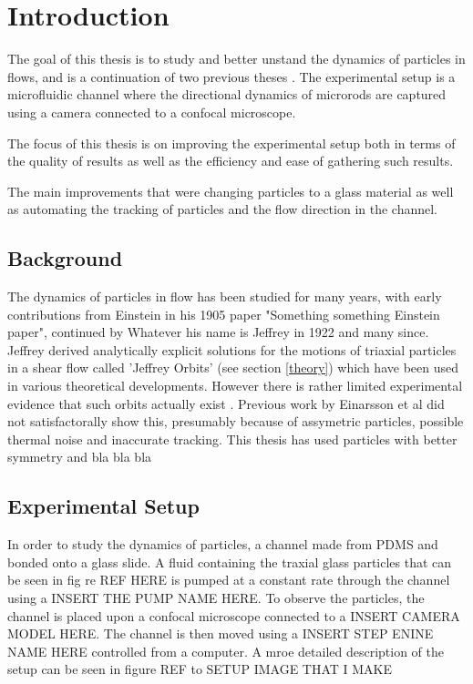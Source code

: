 \documentclass[]{report}
\title{}
\author{}
\begin{document}
\maketitle

\begin{abstract}

\end{abstract}

\chapter{Introduction}
The goal of this thesis is to study and better unstand the dynamics of particles in flows, and is a continuation of two previous theses \cite{AntonExjobb}\cite{JonasExjobb}. The experimental setup is a microfluidic channel where the directional dynamics of microrods are captured using a camera connected to a confocal microscope. 

The focus of this thesis is on improving the experimental setup both in terms of the quality of results as well as the efficiency and ease of gathering such results.

The main improvements that were changing particles to a glass material as well as automating the tracking of particles and the flow direction in the channel.

\section{Background}
The dynamics of particles in flow has been studied for many years, with early contributions from Einstein in his 1905 paper "Something something Einstein paper"\cite{EinsteinsPaper}, continued by Whatever his name is Jeffrey in 1922 and many since. Jeffrey derived analytically explicit solutions for the motions of triaxial particles in a shear flow called 'Jeffrey Orbits' (see section \ref{theory}) which have been used in various theoretical developments. However there is rather limited experimental evidence that such orbits actually exist \cite{IReallyWantACiteHere}. Previous work by Einarsson\cite{EinarssonsPaper} et al did not satisfactorally show this, presumably because of assymetric particles, possible thermal noise and inaccurate tracking. This thesis has used particles with better symmetry and bla bla bla

\section{Experimental Setup}
In order to study the dynamics of particles, a channel made from PDMS and bonded onto a glass slide. A fluid containing the traxial glass particles that can be seen in fig re REF HERE is pumped at a constant rate through the channel using a INSERT THE PUMP NAME HERE. To observe the particles, the channel is placed upon a confocal microscope connected to a INSERT CAMERA MODEL HERE. The channel is then moved using a INSERT STEP ENINE NAME HERE controlled from a computer. A mroe detailed description of the setup can be seen in figure REF to SETUP IMAGE THAT I MAKE
\end{document}
